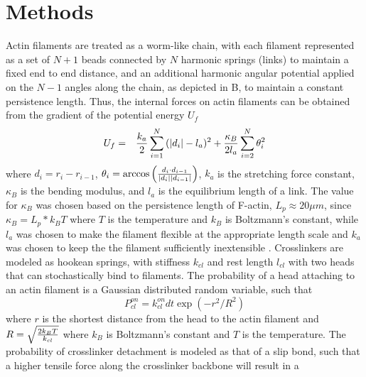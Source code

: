 \documentclass[12pt]{article}
\begin{document}
\section{Methods}  
Actin filaments are treated as a worm-like chain, with each filament represented
as a set of $N+1$ beads connected by $N$ harmonic springs (links) to 
maintain a fixed end to end distance, and an 
additional harmonic angular potential applied on the $N-1$ angles along the
chain, as depicted in B, to maintain a constant persistence length.
Thus, the internal forces on actin filaments can be obtained from the gradient of the
potential energy $U_f$
\begin{eqnarray} 
  U_f &=& {k_a\over2}\sum_{i=1}^{N}{(|d_i| - l_a)^2} + {\kappa_B\over 2l_a}\sum_{i=2}^N{\theta_i^2}
  \label{eqn:Ufil}
\end{eqnarray}
where $d_i = r_i-r_{i-1}$, $\theta_i = \arccos{\left({d_i\cdot d_{i-1}\over |d_i||d_{i-1}|}\right)}$, $k_a$ is the
stretching force constant, $\kappa_B$ is the bending modulus, and $l_a$ is the
equilibrium length of a link. The value for $\kappa_B$ was chosen based on the
persistence length of F-actin, $L_p\approx20\mu m$, since $\kappa_B=L_p*k_BT$ 
where $T$ is the temperature and $k_B$ is Boltzmann's constant\cite{rubinstein},
while $l_a$ was chosen to make the filament flexible at the appropriate length
scale and $k_a$ was chosen to keep the the filament sufficiently inextensible \cite{freedman2016}.
Crosslinkers are modeled as hookean springs, with stiffness $k_{cl}$ and rest length $l_{cl}$
with two heads that can stochastically bind to filaments. 
The probability of a head attaching to an actin filament is a Gaussian
distributed random variable, such that
\begin{equation}
  P_{cl}^{on} = k_{cl}^{on}dt\exp(-r^2/R^2)
  \label{eqn:cl_on}
\end{equation} 
where $r$ is the shortest distance from the head to the actin filament and $R = \sqrt{2k_B T\over k_{cl}}$ 
where $k_B$ is Boltzmann's constant and $T$ is the temperature. 
The probability of crosslinker detachment is modeled as that of a slip bond,
such that a higher tensile force along the crosslinker backbone will result in a 
\end{document}

